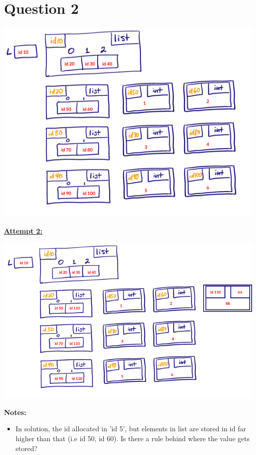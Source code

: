 \documentclass[12pt]{article}
\begin{document}
\section*{Question 2}
\begin{center}
\includegraphics[width=0.5\linewidth]{images/worksheet_1_q2_solution.png}
\end{center}

\bigskip

\begin{mdframed}
    \underline{\textbf{Attempt 2:}}

    \bigskip

    \begin{center}
    \includegraphics[width=0.8\linewidth]{images/worksheet_1_q2_correction.png}
    \end{center}

\end{mdframed}

\bigskip

\textbf{Notes:}

\begin{itemize}
    \item In solution, the id allocated in 'id 5', but elements in list are stored
    in id far higher than that (i.e id 50, id 60). Is there a rule behind where
    the value gets stored?
\end{itemize}
\end{document}
